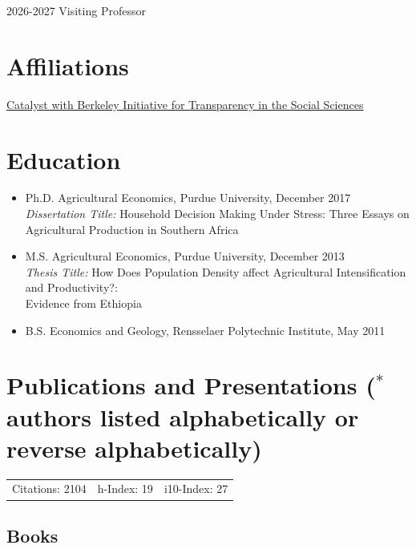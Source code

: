 \documentclass[letterpaper]{article}
\begin{document}
 \hspace{0.2in} 2026-2027 \hspace{0.2in} Visiting Professor


    
\section*{Affiliations}

\hspace{0.1in} \href{https://www.bitss.org/people/anna-josephson/}{Catalyst with Berkeley Initiative for Transparency in the Social Sciences}  


\section*{Education}

\begin{itemize}
  \item Ph.D. Agricultural Economics, Purdue University, December 2017  \\
  \textit{Dissertation Title:} Household Decision Making Under Stress: Three Essays on Agricultural Production in Southern Africa 
  
  \item M.S. Agricultural Economics, Purdue University, December 2013 \\ 
  \textit{Thesis Title:} How Does Population Density affect Agricultural Intensification and Productivity?: \\ Evidence from Ethiopia
  
  \item B.S. Economics and Geology, Rensselaer Polytechnic Institute, May 2011 
  
\end{itemize}


\section*{Publications and Presentations \footnotesize ($^*$authors listed alphabetically or reverse alphabetically)}

\vspace{-0.5\baselineskip}
\begin{tabular}{lll}
Citations: 2104 & h-Index: 19 & i10-Index: 27
\end{tabular}
\vspace{0.5\baselineskip}

\subsection*{Books}
\end{document}
